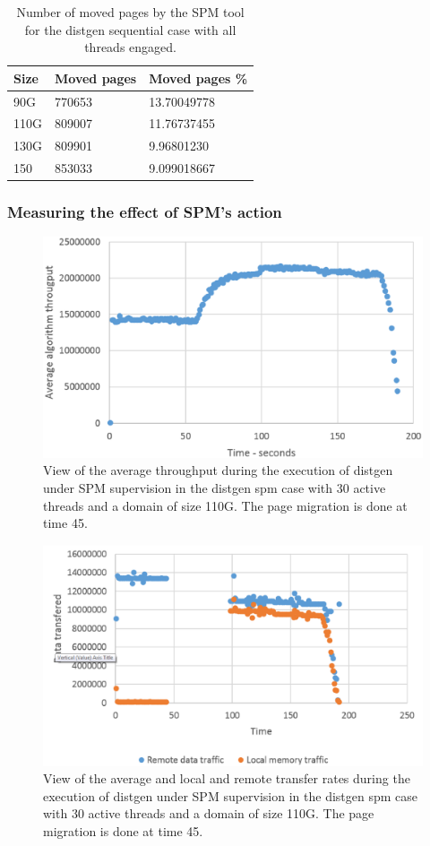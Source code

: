 \begin{table}[th]
	\centering
		\begin{tabularx}{.6\textwidth}{|l|l|X|}
		\hline
			Size & Moved pages & Moved pages \%  \\
			\hline
			90G & 770653 & 13.70049778 \\
			\hline
			110G & 809007 & 11.76737455 \\
			\hline
			130G & 809901 & 9.96801230 \\
			\hline
			150 & 853033 & 9.099018667 \\
			\hline
		\end{tabularx}
		\caption{Number of moved pages by the SPM tool for the distgen sequential case with all threads engaged.}
		\label{table:res-tbl-dgenmvdseqat}
\end{table}
\FloatBarrier
\subsubsection{Measuring the effect of SPM's action}\label{subsection:time-dgenat-action.eps}

\begin{figure}[th]
	\centering
		\includegraphics[width=.8\textwidth]{figures/at-thrput-random.eps}
		\caption{View of the average throughput during the execution of distgen under SPM supervision in the distgen spm case with 30 active threads and a domain of size 110G. The page migration is done at time 45.}
		\label{fig:at-spmactn-thgput}
\end{figure}

\begin{figure}[th]
	\centering
		\includegraphics[width=.8\textwidth]{figures/at-transfer-random.eps}
		\caption{View of the average and local and remote transfer rates during the execution of distgen under SPM supervision in the distgen spm case with 30 active threads and a domain of size 110G. The page migration is done at time 45.}
		\label{fig:at-spmactn-trsfer}
\end{figure}

